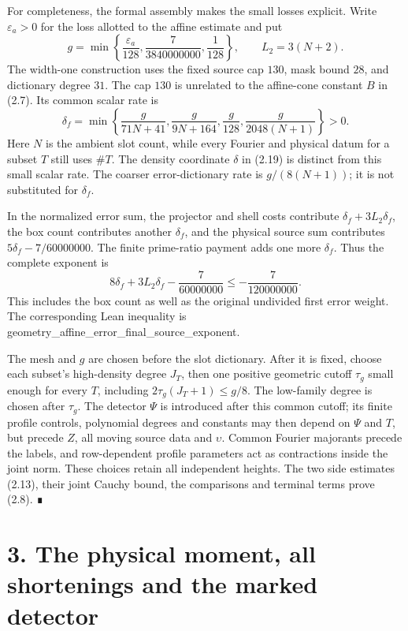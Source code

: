 \documentclass[11pt,a4paper]{article}
\newcommand{\sourcecode}[1]{{\small\ttfamily #1}}
\begin{document}
For completeness, the formal assembly makes the small losses explicit.
Write \(\varepsilon_a>0\) for the loss allotted to the affine estimate
and put \[
g=\min\left\{\frac{\varepsilon_a}{128},
 \frac{7}{3840000000},\frac1{128}\right\},\qquad L_2=3(N+2).
\] The width-one construction uses the fixed source cap \(130\), mask
bound \(28\), and dictionary degree \(31\). The cap \(130\) is unrelated
to the affine-cone constant \(B\) in (2.7). Its common scalar rate is \[
\delta_f=\min\left\{\frac{g}{71N+41},
 \frac{g}{9N+164},\frac{g}{128},\frac{g}{2048(N+1)}\right\}>0.
\tag{2.25}
\] Here \(N\) is the ambient slot count, while every Fourier and
physical datum for a subset \(T\) still uses \(\#T\). The density
coordinate \(\delta\) in (2.19) is distinct from this small scalar rate.
The coarser error-dictionary rate is \(g/(8(N+1))\); it is not
substituted for \(\delta_f\).

In the normalized error sum, the projector and shell costs contribute
\(\delta_f+3L_2\delta_f\), the box count contributes another
\(\delta_f\), and the physical source sum contributes
\(5\delta_f-7/60000000\). The finite prime-ratio payment adds one more
\(\delta_f\). Thus the complete exponent is \[
8\delta_f+3L_2\delta_f-\frac7{60000000}
 \le-\frac7{120000000}.
\tag{2.26}
\] This includes the box count as well as the original undivided first
error weight. The corresponding Lean inequality is
\sourcecode{geometry\_\allowbreak{}\allowbreak{}affine\_\allowbreak{}\allowbreak{}error\_\allowbreak{}\allowbreak{}final\_\allowbreak{}\allowbreak{}source\_\allowbreak{}\allowbreak{}exponent}.

The mesh and \(g\) are chosen before the slot dictionary. After it is
fixed, choose each subset's high-density degree \(J_T\), then one
positive geometric cutoff \(\tau_g\) small enough for every \(T\),
including \(2\tau_g(J_T+1)\le g/8\). The low-family degree is chosen
after \(\tau_g\). The detector \(\Psi\) is introduced after this common
cutoff; its finite profile controls, polynomial degrees and constants
may then depend on \(\Psi\) and \(T\), but precede \(Z\), all moving
source data and \(\upsilon\). Common Fourier majorants precede the
labels, and row-dependent profile parameters act as contractions inside
the joint norm. These choices retain all independent heights. The two
side estimates (2.13), their joint Cauchy bound, the comparisons and
terminal terms prove (2.8). ∎

\hypertarget{the-physical-moment-all-shortenings-and-the-marked-detector}{%
\section{3. The physical moment, all shortenings and the marked
detector}\label{the-physical-moment-all-shortenings-and-the-marked-detector}}
\end{document}
